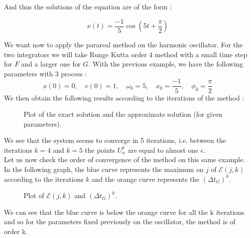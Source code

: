 \noindent And thus the solutions of the equation are of the form :

$$x(t) = \frac{-1}{5}\cos(5t+\frac{\pi}{2})$$

\noindent We want now to apply the parareal method on the harmonic oscillator. For the two integrators we will take Runge Kutta order 4 method with a small time step for $F$ and a larger one for $G$. With the previous example, we have the following parameters with 3 process :
$$x(0)=0,\quad v(0)=1, \quad\omega_0=5, \quad x_0=\frac{-1}{5}, \quad \phi_0=\frac{\pi}{2}$$
We then obtain the following results according to the iterations of the method :
\begin{figure}[H]
	\caption{Plot of the exact solution and the approximate solution (for given parameters).}
\end{figure}
\noindent We see that the system seems to converge in 5 iterations, i.e. between the iterations $k=4$ and $k=5$ the points $U_n^k$ are equal to almost one $\epsilon$. \\

\noindent Let us now check the order of convergence of the method on this same example. In the following graph, the blue curve represents the maximum on $j$ of $\mathcal{E}(j,k)$ according to the iterations $k$ and the orange curve represents the $(\Delta t_G)^k$.
\begin{figure}[H]
	\centering
	\caption{Plot of $\mathcal{E}(j,k)$ and $(\Delta t_G)^k$.}
\end{figure}
\noindent We can see that the blue curve is below the orange curve for all the k iterations and so for the parameters fixed previously on the oscillator, the method is of order k.

